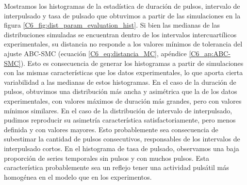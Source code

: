 \documentclass[./main.tex]{subfiles}
\begin{document}
Mostramos los histogramas de la estadística de duración de pulsos, intervalo de interpulsado y tasa de pulsado que obtuvimos a partir de las simulaciones en la figura \ref{C6_fig:dist_param_evaluation_hist}. Si bien las medianas de las distribuciones simuladas se encuentran dentro de los intervalos intercuartílicos experimentales, su distancia no responde a los valores mínimos de tolerancia del ajuste ABC-SMC (ecuación \ref{C6_eq:distancia_MC}, apéndice \ref{C6_ap:ABC-SMC}). Esto es consecuencia de generar los histogramas a partir de simulaciones con las mismas características que los datos experimentales, lo que aporta cierta variabilidad a las medianas de estos histogramas. En el caso de la duración de pulsos, obtuvimos una distribución más ancha y asimétrica que la de los datos experimentales, con valores máximos de duración más grandes, pero con valores mínimos similares. En el caso de la distribución de intervalo de interpulsado, pudimos  reproducir su asimetría característica satisfactoriamente, pero menos definida y con valores mayores. Esto probablemente sea consecuencia de subestimar la cantidad de pulsos consecutivos, responsables de los intervalos de interpulsado cortos. En el histograma de tasa de pulsado, observamos una baja proporción de series temporales sin pulsos y con muchos pulsos. Esta característica probablemente sea un reflejo tener una actividad pulsátil más homogénea en el modelo que en los experimentos. 
\end{document}
